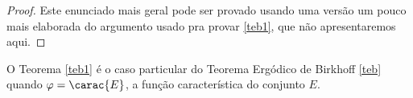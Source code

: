 \begin{proof}
Este enunciado mais geral pode ser provado usando uma versão um pouco mais elaborada do argumento usado pra provar \ref{teb1}, que não apresentaremos aqui.
\end{proof}

\begin{obs}
O Teorema \ref{teb1} é o caso particular do Teorema Ergódico de Birkhoff \eqref{teb} quando $\varphi=\carac{E}$, a função característica do conjunto $E$.
\end{obs}

























